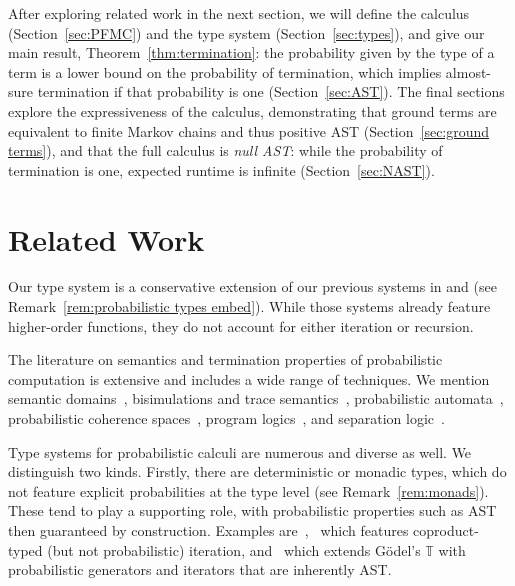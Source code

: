 \documentclass[a4paper,UKenglish,cleveref, autoref, thm-restate]{lipics-v2021}
\begin{document}
After exploring related work in the next section, we will define the calculus (Section~\ref{sec:PFMC}) and the type system (Section~\ref{sec:types}), and give our main result, Theorem~\ref{thm:termination}: the probability given by the type of a term is a lower bound on the probability of termination, which implies almost-sure termination if that probability is one (Section~\ref{sec:AST}). The final sections explore the expressiveness of the calculus, demonstrating that ground terms are equivalent to finite Markov chains and thus positive AST (Section~\ref{sec:ground terms}), and that the full calculus is \emph{null AST}: while the probability of termination is one, expected runtime is infinite (Section~\ref{sec:NAST}).


\section{Related Work}
\label{sec:related work}

Our type system is a conservative extension of our previous systems in \cite{Antonelli-DalLago-Pistone-2022} and \cite{Heijltjes-Majury-2025} (see Remark~\ref{rem:probabilistic types embed}). While those systems already feature higher-order functions, they do not account for either iteration or recursion.

The literature on semantics and termination properties of probabilistic computation is extensive and includes a wide range of techniques. We mention semantic domains~\cite{Dahlqvist-Kozen-2020,Kozen-1981,Vakar-Kammar-Staton-2019}, bisimulations and trace semantics~\cite{vanGlabbeek-Smolka-Steffen-1995,Silva-Sokolova-2011,Stark-Smolka-2000}, probabilistic automata~\cite{Esparza-Kucera-Mayr-2004,Etessami-Yannakakis-2009}, probabilistic coherence spaces~\cite{Crubille-Ehrhard-Pagani-Tasson-2017,Danos-Ehrhard-2011,Ehrhard-Tasson-2019}, program  logics~\cite{FerrerFioriti-Hermanns-2015,McIver-Morgan-Kaminski-Katoen-2018}, and separation logic~\cite{Barthe-Hsu-Liao-2020,Jereb-Simpson-2025}.

Type systems for probabilistic calculi are numerous and diverse as well. We distinguish two kinds. Firstly, there are deterministic or monadic types, which do not feature explicit probabilities at the type level (see Remark~\ref{rem:monads}). These tend to play a supporting role, with probabilistic properties such as AST then guaranteed by construction. Examples are~\cite{TorrezRuiz-Piedeleu-Silva-Zanasi-2024},~\cite{Staton-2017} which features coproduct-typed (but not probabilistic) iteration, and~\cite{Breuvart-DalLago-Herrou-2021} which extends G\"odel's $\mathbb{T}$ with probabilistic generators and iterators that are inherently AST.
\end{document}
